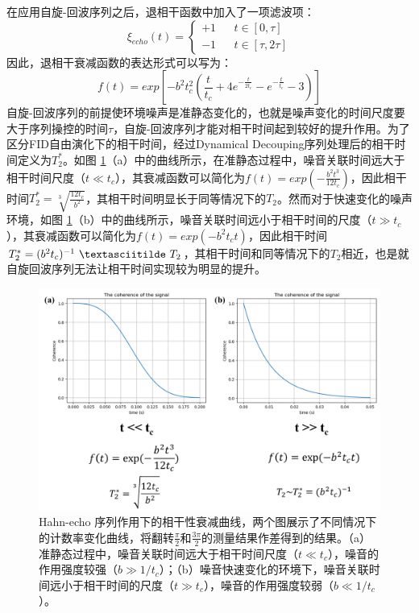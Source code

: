 \documentclass[type = bachelor, oneside]{whu-thesis}
\begin{document}
在应用自旋-回波序列之后，退相干函数中加入了一项滤波项：
\begin{equation}
  \xi_{echo}(t)=\left\{
  \begin{array}{rcl}
  +1 & & {t \in [0, \tau]}\\
  -1 & & {t \in [\tau, 2\tau]}
  \end{array} \right.
  \end{equation}
因此，退相干衰减函数的表达形式可以写为：
\begin{equation}
  f(t) = exp[-b^2t_c^2(\frac{t}{t_c}+4e^{-\frac{t}{2t_c}}-e^{-\frac{t}{t_c}}-3)]
\end{equation}
自旋-回波序列的前提使环境噪声是准静态变化的，也就是噪声变化的时间尺度要大于序列操控的时间$\tau$，自旋-回波序列才能对相干时间起到较好的提升作用。为了区分FID自由演化下的相干时间，经过Dynamical Decouping序列处理后的相干时间定义为$T_2^*$。如图 \ref{fig: Hahn Functions}（a）中的曲线所示，在准静态过程中，噪音关联时间远大于相干时间尺度（$t\ll t_c$），其衰减函数可以简化为$f(t) = exp(-\frac{b^2t^3}{12t_c})$，因此相干时间$T_2^*=\sqrt[3]{\frac{12t_c}{b^2}}$，其相干时间明显长于同等情况下的$T_2$。然而对于快速变化的噪声环境，如图 \ref{fig: Hahn Functions}（b）中的曲线所示，噪音关联时间远小于相干时间的尺度（$t\gg t_c$），其衰减函数可以简化为$f(t) = exp(-b^2t_ct)$，因此相干时间$T_2^*=(b^2t_c)^{-1}\ \textasciitilde \ T_2$，其相干时间和同等情况下的$T_2$相近，也是就自旋回波序列无法让相干时间实现较为明显的提升。
\begin{figure}
  \centering
  \includegraphics[width=1.0\textwidth]{figures/Chapter 2/Hahn Functions.png}
  \caption[Hahn-echo 序列作用下的相干性衰减曲线]{Hahn-echo 序列作用下的相干性衰减曲线，两个图展示了不同情况下的计数率变化曲线，将翻转$\frac{\pi}{2}$和$\frac{3\pi}{2}$的测量结果作差得到的结果。（a）准静态过程中，噪音关联时间远大于相干时间尺度（$t\ll t_c$），噪音的作用强度较强（$b\gg 1/t_c$）；（b）噪音快速变化的环境下，噪音关联时间远小于相干时间的尺度（$t\gg t_c$），噪音的作用强度较弱（$b\ll 1/t_c$）。}
  \label{fig: Hahn Functions}
\end{figure}
\end{document}
